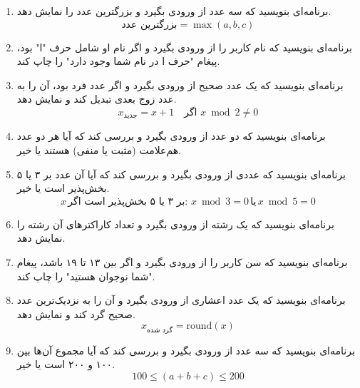 \documentclass[a4paper,12pt]{article}
\begin{document}
\begin{enumerate}
		\item برنامه‌ای بنویسید که سه عدد از ورودی بگیرد و بزرگترین عدد را نمایش دهد.
		\[
		\text{بزرگترین عدد} = \max(a, b, c)
		\]
		
		\item برنامه‌ای بنویسید که نام کاربر را از ورودی بگیرد و اگر نام او شامل حرف "ا" بود، پیغام "حرف ا در نام شما وجود دارد" را چاپ کند.
		
		\item برنامه‌ای بنویسید که یک عدد صحیح از ورودی بگیرد و اگر عدد فرد بود، آن را به عدد زوج بعدی تبدیل کند و نمایش دهد.
		\[
		x_{\text{جدید}} = x + 1 \quad \text{اگر } x \bmod 2 \neq 0
		\]
		
		\item برنامه‌ای بنویسید که دو عدد از ورودی بگیرد و بررسی کند که آیا هر دو عدد هم‌علامت (مثبت یا منفی) هستند یا خیر.
		
		\item برنامه‌ای بنویسید که عددی از ورودی بگیرد و بررسی کند که آیا آن عدد بر ۳ یا ۵ بخش‌پذیر است یا خیر.
		\[
		x \, \text{بر ۳ یا ۵ بخش‌پذیر است اگر: } x \bmod 3 = 0 \, \text{یا} \, x \bmod 5 = 0
		\]
		
		\item برنامه‌ای بنویسید که یک رشته از ورودی بگیرد و تعداد کاراکترهای آن رشته را نمایش دهد.
		
		\item برنامه‌ای بنویسید که سن کاربر را از ورودی بگیرد و اگر بین ۱۳ تا ۱۹ باشد، پیغام "شما نوجوان هستید" را چاپ کند.
		
		\item برنامه‌ای بنویسید که یک عدد اعشاری از ورودی بگیرد و آن را به نزدیک‌ترین عدد صحیح گرد کند و نمایش دهد.
		\[
		x_{\text{گرد شده}} = \text{round}(x)
		\]
		
		\item برنامه‌ای بنویسید که سه عدد از ورودی بگیرد و بررسی کند که آیا مجموع آن‌ها بین ۱۰۰ و ۲۰۰ است یا خیر.
		\[
		100 \leq (a + b + c) \leq 200
		\]
		
	\end{enumerate}
	
	\newpage
\end{document}
